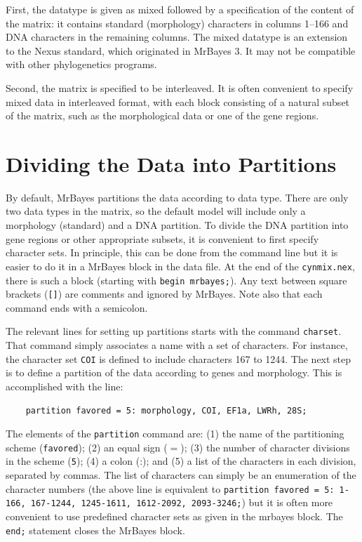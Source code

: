 \documentclass[12pt]{book}
\newcommand{\ttt}[1]{\texttt{#1}}
\begin{document}
First, the datatype is given as mixed followed by a specification of the content of the matrix: it
contains standard (morphology) characters in columns 1--166 and DNA characters in the remaining
columns. The mixed datatype is an extension to the Nexus standard, which originated in MrBayes 3.
It may not be compatible with other phylogenetics programs.

Second, the matrix is specified to be interleaved. It is often convenient to specify mixed data in
interleaved format, with each block consisting of a natural subset of the matrix, such as the
morphological data or one of the gene regions.

\section{Dividing the Data into Partitions}

By default, MrBayes partitions the data according to data type. There are only two data types in
the matrix, so the default model will include only a morphology (standard) and a DNA partition. To
divide the DNA partition into gene regions or other appropriate subsets, it is convenient to first
specify character sets. In principle, this can be done from the command line but it is easier to
do it in a MrBayes block in the data file. At the end of the \ttt{cynmix.nex}, there is such a
block (starting with \ttt{begin mrbayes;}). Any text between square brackets (\ttt{[]}) are comments
and ignored by MrBayes. Note also that each command ends with a semicolon.

The relevant lines for setting up partitions starts with the command \ttt{charset}. That command
simply associates a name with a set of characters. For instance, the character set \ttt{COI} is
defined to include characters 167 to 1244. The next step is to define a partition of the data
according to genes and morphology. This is accomplished with the line:

\begin{singlespacing}
\footnotesize
\begin{verbatim}
    partition favored = 5: morphology, COI, EF1a, LWRh, 28S;
\end{verbatim}
\normalsize
\end{singlespacing}

The elements of the \ttt{partition} command are: (1) the name of the partitioning scheme
(\ttt{favored}); (2) an equal sign ($=$); (3) the number of character divisions in the scheme
(\ttt{5}); (4) a colon (:); and (5) a list of the characters in each division, separated by commas.
The list of characters can simply be an enumeration of the character numbers (the above line is
equivalent to \ttt{partition favored = 5: 1-166, 167-1244, 1245-1611, 1612-2092, 2093-3246;}) but
it is often more convenient to use predefined character sets as given in the mrbayes block. The
\ttt{end;} statement closes the MrBayes block.
\end{document}
